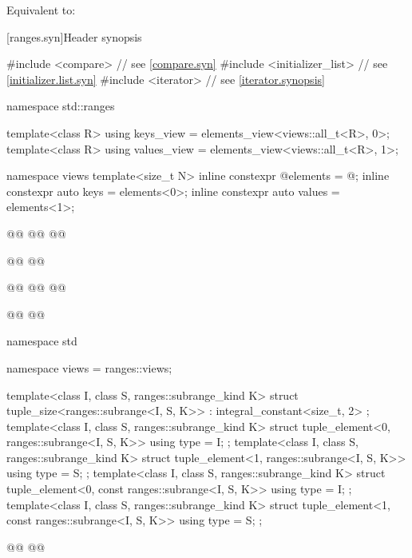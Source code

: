 \documentclass{wg21}
\begin{document}
\begin{itemdescr}
    \pnum
    \effects
    Equivalent to: 
\end{itemdescr}


[ranges.syn]{Header  synopsis}
%
\begin{codeblock}
#include <compare>              // see \ref{compare.syn}
#include <initializer_list>     // see \ref{initializer.list.syn}
#include <iterator>             // see \ref{iterator.synopsis}

namespace std::ranges {
    template<class R>
    using keys_view = elements_view<views::all_t<R>, 0>;
    template<class R>
    using values_view = elements_view<views::all_t<R>, 1>;

    namespace views {
        template<size_t N>
        inline constexpr @\unspec@ elements = @\unspec@ ;
        inline constexpr auto keys = elements<0>;
        inline constexpr auto values = elements<1>;
    }

    @@
    @@
    @@

    @@
    @@

    @@
    @@
    @@

    @@
    @@
}
namespace std {
    namespace views = ranges::views;

    template<class I, class S, ranges::subrange_kind K>
    struct tuple_size<ranges::subrange<I, S, K>>
    : integral_constant<size_t, 2> {};
    template<class I, class S, ranges::subrange_kind K>
    struct tuple_element<0, ranges::subrange<I, S, K>> {
        using type = I;
    };
    template<class I, class S, ranges::subrange_kind K>
    struct tuple_element<1, ranges::subrange<I, S, K>> {
        using type = S;
    };
    template<class I, class S, ranges::subrange_kind K>
    struct tuple_element<0, const ranges::subrange<I, S, K>> {
        using type = I;
    };
    template<class I, class S, ranges::subrange_kind K>
    struct tuple_element<1, const ranges::subrange<I, S, K>> {
        using type = S;
    };

    @@
    @@
}

\end{codeblock}
\end{document}
